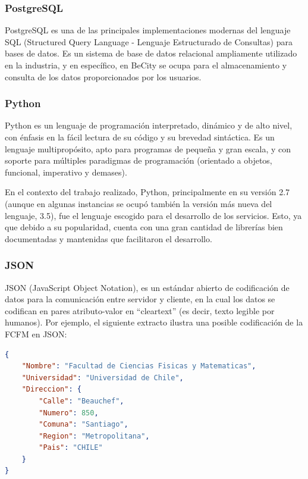 \documentclass[11pt,letterpaper]{article}
\begin{document}

\subsubsection{PostgreSQL}

PostgreSQL\cite{postgres} es una de las principales implementaciones modernas del lenguaje SQL (Structured Query Language - Lenguaje Estructurado de Consultas) para bases de datos. Es un sistema de base de datos relacional ampliamente utilizado en la industria, y en específico, en BeCity se ocupa para el almacenamiento y consulta de los datos proporcionados por los usuarios.

\subsubsection{Python}

Python es un lenguaje de programación interpretado, dinámico y de alto nivel, con énfasis en la fácil lectura de su código y su brevedad sintáctica. Es un lenguaje multipropósito, apto para programas de pequeña y gran escala, y con soporte para múltiples paradigmas de programación (orientado a objetos, funcional, imperativo y demases).

En el contexto del trabajo realizado, Python, principalmente en su versión 2.7 (aunque en algunas instancias se ocupó también la versión más nueva del lenguaje, 3.5), fue el lenguaje escogido para el desarrollo de los servicios. Esto, ya que debido a su popularidad, cuenta con una gran cantidad de librerías bien documentadas y mantenidas que facilitaron el desarrollo.

\subsubsection{JSON}

JSON\cite{json} (JavaScript Object Notation), es un estándar abierto de codificación de datos para la comunicación entre servidor y cliente, en la cual los datos se codifican en pares atributo-valor en ``cleartext'' (es decir, texto legible por humanos).
Por ejemplo, el siguiente extracto ilustra una posible codificación de la FCFM en JSON:
\begin{lstlisting}[language=JSON]
{
    "Nombre": "Facultad de Ciencias Fisicas y Matematicas",
    "Universidad": "Universidad de Chile",
    "Direccion": {
        "Calle": "Beauchef",
        "Numero": 850,
        "Comuna": "Santiago",
        "Region": "Metropolitana",
        "Pais": "CHILE"
    }
}
\end{lstlisting}
\end{document}
